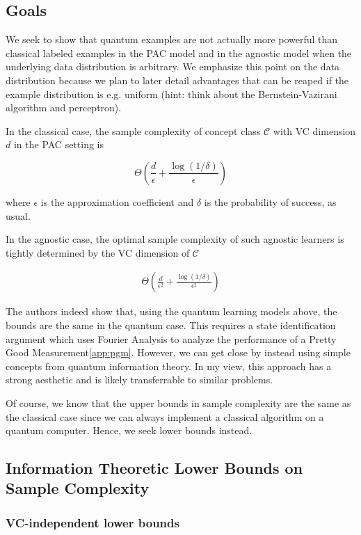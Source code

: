 \documentclass[main.tex]{subfiles}
\begin{document}
\subsection{Goals}

We seek to show that quantum examples are not actually more powerful than classical labeled examples in the PAC model and in the agnostic model when the underlying data distribution is arbitrary. We emphasize this point on the data distribution because we plan to later detail advantages that can be reaped if the example distribution is e.g. uniform (hint: think about the Bernstein-Vazirani algorithm and perceptron).

In the classical case, the sample complexity of concept class $\mathcal{C}$ with VC dimension $d$ in the PAC setting is

$$
\Theta(\frac{d}{\epsilon} + \frac{\log(1/\delta)}{\epsilon})
$$

where $\epsilon$ is the approximation coefficient and $\delta$ is the probability of success, as usual.

In the agnostic case, the optimal sample complexity of such agnostic learners is tightly determined by the VC dimension of $\mathcal{C}$

\begin{align*}
\Theta(\frac{d}{\epsilon^2} + \frac{\log(1/\delta)}{\epsilon^2})
\end{align*}

The authors indeed show that, using the quantum learning models above, the bounds are the same in the quantum case. This requires a state identification argument which uses Fourier Analysis to analyze the performance of a Pretty Good Measurement\ref{app:pgm}. However, we can get close by instead using simple concepts from quantum information theory. In my view, this approach has a strong aesthetic and is likely transferrable to similar problems.

Of course, we know that the upper bounds in sample complexity are the same as the classical case since we can always implement a classical algorithm on a quantum computer. Hence, we seek lower bounds instead. 

\subsection{Information Theoretic Lower Bounds on Sample Complexity}

\subsubsection{VC-independent lower bounds}
\end{document}
